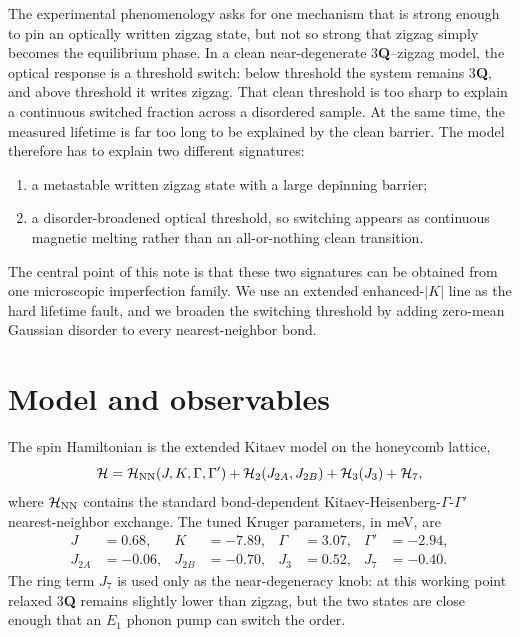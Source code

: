 \documentclass[aps,prb,twocolumn,superscriptaddress,floatfix,nofootinbib]{revtex4-2}
\newcommand{\threeQ}{3\textbf{Q}}
\begin{document}
The experimental phenomenology asks for one mechanism that is strong enough to
pin an optically written zigzag state, but not so strong that zigzag simply
becomes the equilibrium phase.  In a clean near-degenerate \threeQ--zigzag model,
the optical response is a threshold switch: below threshold the system remains
\threeQ, and above threshold it writes zigzag.  That clean threshold is too sharp
to explain a continuous switched fraction across a disordered sample.  At the
same time, the measured lifetime is far too long to be explained by the clean
barrier.  The model therefore has to explain two different signatures:
\begin{enumerate}
\item a metastable written zigzag state with a large depinning barrier;
\item a disorder-broadened optical threshold, so switching appears as continuous
magnetic melting rather than an all-or-nothing clean transition.
\end{enumerate}
The central point of this note is that these two signatures can be obtained from
one microscopic imperfection family.  We use an extended enhanced-$|K|$ line as
the hard lifetime fault, and we broaden the switching threshold by adding
zero-mean Gaussian disorder to every nearest-neighbor bond.

\section{Model and observables}

The spin Hamiltonian is the extended Kitaev model on the honeycomb lattice,
\begin{equation}
\mathcal H=\mathcal H_{\rm NN}(J,K,\Gamma,\Gamma')
+\mathcal H_{2}(J_{2A},J_{2B})+\mathcal H_{3}(J_3)+\mathcal H_7,
\end{equation}
where $\mathcal H_{\rm NN}$ contains the standard bond-dependent
Kitaev-Heisenberg-$\Gamma$-$\Gamma'$ nearest-neighbor exchange.  The tuned Kruger
parameters, in meV, are
\begin{equation}
\begin{aligned}
J&=0.68, & K&=-7.89, & \Gamma&=3.07, & \Gamma'&=-2.94,\\
J_{2A}&=-0.06, & J_{2B}&=-0.70, & J_3&=0.52, & J_7&=-0.40.
\end{aligned}
\end{equation}
The ring term $J_7$ is used only as the near-degeneracy knob: at this
working point relaxed \threeQ{} remains slightly lower than zigzag, but the two
states are close enough that an $E_1$ phonon pump can switch the order.
\end{document}
